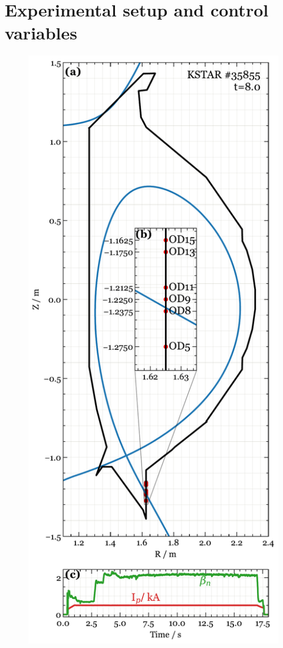 \section{Experimental setup and control variables}
\label{sec:control_variables}

\begin{figure}[!ht]
 \centering
 \includegraphics[width=\linewidth]{figures/RefShot.pdf}

\end{figure}
